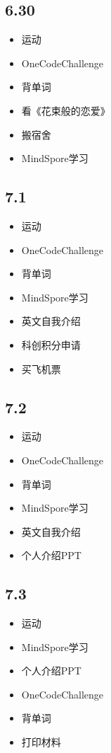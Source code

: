\documentclass[UTF8]{ctexart}
\begin{document}
\subsection*{6.30}
\begin{itemize}
    \item 运动
    \item OneCodeChallenge
    \item 背单词
    \item 看《花束般的恋爱》
    \item 搬宿舍
    \item MindSpore学习
\end{itemize}

\subsection*{7.1}
\begin{itemize}
    \item 运动
    \item OneCodeChallenge
    \item 背单词
    \item MindSpore学习
    \item 英文自我介绍
    \item 科创积分申请
    \item 买飞机票
\end{itemize}

\subsection*{7.2}
\begin{itemize}
    \item 运动
    \item OneCodeChallenge
    \item 背单词
    \item MindSpore学习
    \item 英文自我介绍
    \item 个人介绍PPT
\end{itemize}

\subsection*{7.3}
\begin{itemize}
    \item 运动
    \item MindSpore学习
    \item 个人介绍PPT
    \item OneCodeChallenge
    \item 背单词
    \item 打印材料
\end{itemize}
\end{document}

